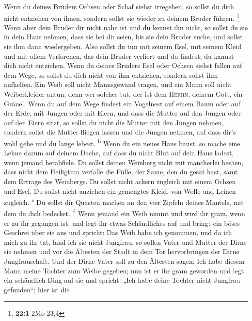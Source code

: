  Wenn du deines Bruders Ochsen oder Schaf siehst
irregehen, so sollst du dich nicht entziehen von ihnen, sondern sollst
sie wieder zu deinem Bruder führen. \footnote{\textbf{22:1} 2Mo 23,4}
 Wenn aber dein Bruder dir nicht nahe ist und du kennst
ihn nicht, so sollst du sie in dein Haus nehmen, dass sie bei dir seien,
bis sie dein Bruder suche, und sollst sie ihm dann wiedergeben.
 Also sollst du tun mit seinem Esel, mit seinem Kleid und
mit allem Verlorenen, das dein Bruder verliert und du findest; du kannst
dich nicht entziehen.  Wenn du deines Bruders Esel oder
Ochsen siehst fallen auf dem Wege, so sollst du dich nicht von ihm
entziehen, sondern sollst ihm aufhelfen.  Ein Weib soll
nicht Mannsgewand tragen, und ein Mann soll nicht Weiberkleider antun;
denn wer solches tut, der ist dem \textsc{Herrn}, deinem Gott, ein
Gräuel.  Wenn du auf dem Wege findest ein Vogelnest auf
einem Baum oder auf der Erde, mit Jungen oder mit Eiern, und dass die
Mutter auf den Jungen oder auf den Eiern sitzt, so sollst du nicht die
Mutter mit den Jungen nehmen,  sondern sollst die Mutter
fliegen lassen und die Jungen nehmen, auf dass dir's wohl gehe und du
lange lebest. \textsuperscript{b}  Wenn du ein neues Haus
baust, so mache eine Lehne darum auf deinem Dache, auf dass du nicht
Blut auf dein Haus ladest, wenn jemand herabfiele.  Du
sollst deinen Weinberg nicht mit mancherlei besäen, dass nicht dem
Heiligtum verfalle die Fülle, der Same, den du gesät hast, samt dem
Ertrage des Weinbergs.  Du sollst nicht ackern zugleich
mit einem Ochsen und Esel.  Du sollst nicht anziehen ein
gemengtes Kleid, von Wolle und Leinen zugleich. \textsuperscript{c}
 Du sollst dir Quasten machen an den vier Zipfeln deines
Mantels, mit dem du dich bedeckst. \textsuperscript{d} 
Wenn jemand ein Weib nimmt und wird ihr gram, wenn er zu ihr gegangen
ist,  und legt ihr etwas Schändliches auf und bringt ein
böses Geschrei über sie aus und spricht: Das Weib habe ich genommen, und
da ich mich zu ihr tat, fand ich sie nicht Jungfrau,  so
sollen Vater und Mutter der Dirne sie nehmen und vor die Ältesten der
Stadt in dem Tor hervorbringen der Dirne Jungfrauschaft. 
Und der Dirne Vater soll zu den Ältesten sagen: Ich habe diesem Mann
meine Tochter zum Weibe gegeben; nun ist er ihr gram geworden
 und legt ein schändlich Ding auf sie und spricht: „Ich
habe deine Tochter nicht Jungfrau gefunden``; hier ist die
